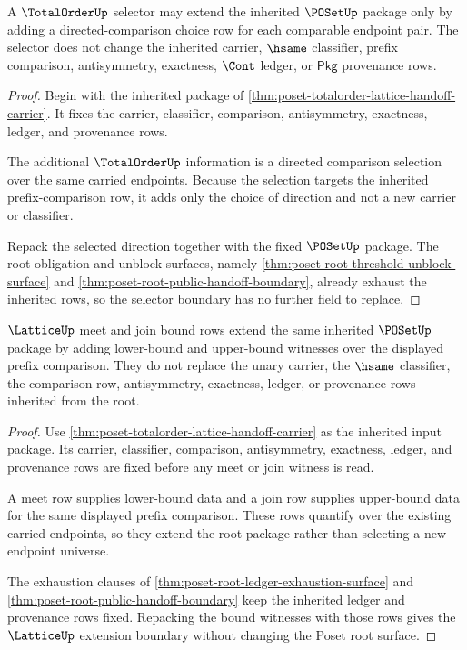 \begin{theorem}
\label{thm:poset-totalorder-selector-extension-boundary}
A $\TotalOrderUp$ selector may extend the inherited $\POSetUp$ package only by
adding a directed-comparison choice row for each comparable endpoint pair. The
selector does not change the inherited carrier, $\hsame$ classifier, prefix
comparison, antisymmetry, exactness, $\Cont$ ledger, or $\mathsf{Pkg}$
provenance rows.
\end{theorem}
\begin{proof}
Begin with the inherited package of
\autoref{thm:poset-totalorder-lattice-handoff-carrier}. It fixes the carrier,
classifier, comparison, antisymmetry, exactness, ledger, and provenance rows.

The additional $\TotalOrderUp$ information is a directed comparison selection
over the same carried endpoints. Because the selection targets the inherited
prefix-comparison row, it adds only the choice of direction and not a new
carrier or classifier.

Repack the selected direction together with the fixed $\POSetUp$ package. The
root obligation and unblock surfaces, namely
\autoref{thm:poset-root-threshold-unblock-surface} and
\autoref{thm:poset-root-public-handoff-boundary}, already exhaust the
inherited rows, so the selector boundary has no further field to replace.
\end{proof}

\begin{theorem}
\label{thm:poset-lattice-bound-extension-boundary}
$\LatticeUp$ meet and join bound rows extend the same inherited $\POSetUp$
package by adding lower-bound and upper-bound witnesses over the displayed
prefix comparison. They do not replace the unary carrier, the $\hsame$
classifier, the comparison row, antisymmetry, exactness, ledger, or provenance
rows inherited from the root.
\end{theorem}
\begin{proof}
Use \autoref{thm:poset-totalorder-lattice-handoff-carrier} as the inherited
input package. Its carrier, classifier, comparison, antisymmetry, exactness,
ledger, and provenance rows are fixed before any meet or join witness is read.

A meet row supplies lower-bound data and a join row supplies upper-bound data
for the same displayed prefix comparison. These rows quantify over the
existing carried endpoints, so they extend the root package rather than
selecting a new endpoint universe.

The exhaustion clauses of
\autoref{thm:poset-root-ledger-exhaustion-surface} and
\autoref{thm:poset-root-public-handoff-boundary} keep the inherited ledger and
provenance rows fixed. Repacking the bound witnesses with those rows gives the
$\LatticeUp$ extension boundary without changing the Poset root surface.
\end{proof}
